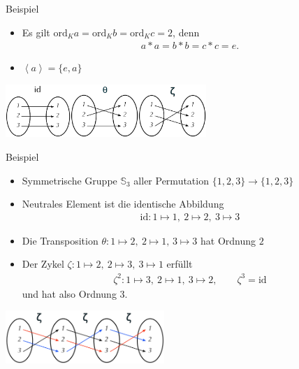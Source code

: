 \documentclass{beamer}
\renewcommand\SS{\mathbb S}
\newcommand{\ord}{\mathrm{ord}}
\newcommand{\id}{\mathrm{id}}
\newcommand{\bck}[1]{\left\langle{#1}\right\rangle}
\newcommand{\ue}{\"u}
\begin{document}
\begin{frame}
\begin{overprint}
\begin{block}{Beispiel}
\begin{itemize}
				\item Es gilt $\ord_Ka=\ord_Kb=\ord_Kc=2$, denn
					\begin{align*}
					a*a=b*b=c*c=e.
					\end{align*}
				\item $\bck a=\{e,a\}$
			\end{itemize}		
		\end{block}
			\includegraphics[height=20mm]{pics/idS3.pdf}\hfill\includegraphics[height=20mm]{pics/thetaS3.pdf}\hfill\includegraphics[height=20mm]{pics/zetaS3.pdf}
		\begin{block}{Beispiel}
			\begin{itemize}
				\item Symmetrische Gruppe $\SS_3$ aller Permutation $\{1,2,3\}\to\{1,2,3\}$
				\item Neutrales Element ist die identische Abbildung
					\begin{align*}
					\id:1\mapsto 1,\ 2\mapsto2,\ 3\mapsto3
					\end{align*}
				\item Die Transposition $\theta: 1\mapsto 2,\ 2\mapsto 1,\, 3\mapsto 3 $
					hat Ordnung $2$
				\item Der Zykel $ \zeta:1\mapsto 2,\ 2\mapsto 3,\ 3\mapsto 1 $
					erf\ue llt
					\begin{align*}
					\zeta^2:1\mapsto 3,\ 2\mapsto 1,\ 3\mapsto 2,\qquad \zeta^3=\id
					\end{align*}
					und hat also Ordnung 3.
			\end{itemize}	
		\end{block}
			\hfill\includegraphics[height=20mm]{pics/zeta3S3.pdf}

\end{overprint}
\end{frame}
\end{document}
